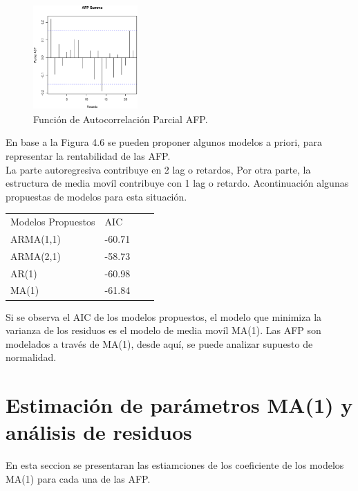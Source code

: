 \begin{figure}[!ht]
\begin{center}
  \includegraphics[height=4cm, width=4cm]{pacf7.eps}
   \caption{Funci\'on de Autocorrelaci\'on Parcial AFP.}
\label{caja}
\end{center}
\end{figure}
En base a la Figura 4.6 se pueden proponer algunos modelos a priori, para representar la rentabilidad de las AFP.\\
La parte autoregresiva contribuye en 2 lag o retardos, Por otra parte, la estructura de media mov\'il contribuye con 1 lag o retardo. Acontinuaci\'on algunas propuestas de modelos para esta situaci\'on.
\begin{center}
\begin{tabular}{|l|l|ll}
\cline{1-2}
Modelos Propuestos & AIC &  &  \\
\cline{1-2}
ARMA(1,1) & -60.71 &  &  \\
ARMA(2,1) & -58.73 &  &  \\
AR(1) & -60.98 &  &  \\
MA(1) & -61.84 &  &  \\
\cline{1-2}
\end{tabular}
\end{center}

Si se observa el AIC de los modelos propuestos, el modelo que minimiza la varianza de los residuos es el modelo de media mov\'il MA(1). Las AFP son modelados a trav\'es de  MA(1), desde aqu\'i, se puede analizar supuesto de normalidad.

\section{Estimaci\'on de par\'ametros MA(1) y an\'alisis de residuos}
En esta seccion se presentaran las estiamciones de los coeficiente de los modelos MA(1) para cada una de las AFP.
